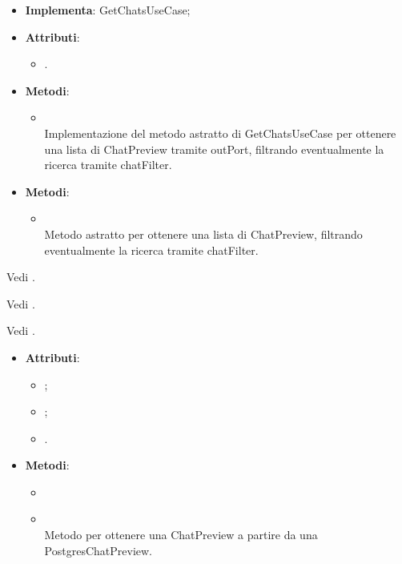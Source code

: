 \documentclass[10pt, a4paper]{article}
\begin{document}
\label{GetChatsServiceDettaglio}
\begin{itemize}
    \item \textbf{Implementa}: GetChatsUseCase;
    \item \textbf{Attributi}:
    \begin{itemize}
        \item {}.
    \end{itemize}
    \item \textbf{Metodi}:
    \begin{itemize}
        \item {}\\
        Implementazione del metodo astratto di GetChatsUseCase per ottenere una lista di ChatPreview tramite outPort, filtrando eventualmente la ricerca tramite chatFilter.
    \end{itemize}
\end{itemize}


\label{GetChatsUseCaseDettaglio}
\begin{itemize}
    \item \textbf{Metodi}:
    \begin{itemize}
        \item {}\\
        Metodo astratto per ottenere una lista di ChatPreview, filtrando eventualmente la ricerca tramite chatFilter.
    \end{itemize}
\end{itemize}


Vedi .

Vedi .



Vedi .


\label{PostgresChatPreviewDettaglio}
\begin{itemize}
    \item \textbf{Attributi}:
    \begin{itemize}
        \item {};
        \item {};
        \item {}.
    \end{itemize}
    \item \textbf{Metodi}:
    \begin{itemize}
        \item \item {}\\ 
        Metodo per ottenere una ChatPreview a partire da una PostgresChatPreview.
    \end{itemize}
\end{itemize}
\end{document}
